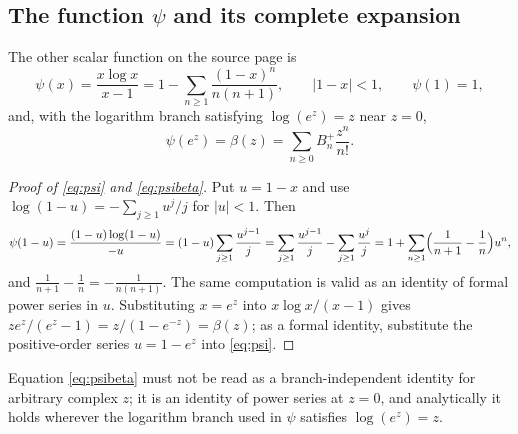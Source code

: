 \subsection{The function \texorpdfstring{$\psi$}{psi} and its complete expansion}
The other scalar function on the source page is
\begin{equation}\label{eq:psi}
 \psi(x)=\frac{x\log x}{x-1}=1-\sum_{n\geq1}\frac{(1-x)^n}{n(n+1)},
 \qquad|1-x|<1,\qquad \psi(1)=1,
\end{equation}
and, with the logarithm branch satisfying $\log(e^z)=z$ near $z=0$,
\begin{equation}\label{eq:psibeta}
 \psi(e^z)=\beta(z)=\sum_{n\geq0}B_n^+\frac{z^n}{n!}.
\end{equation}
\begin{proof}[Proof of \eqref{eq:psi} and \eqref{eq:psibeta}]
Put $u=1-x$ and use $\log(1-u)=-\sum_{j\geq1}u^j/j$ for $|u|<1$. Then
\[
 \psi(1-u)=\frac{(1-u)\log(1-u)}{-u}
 =(1-u)\sum_{j\geq1}\frac{u^{j-1}}{j}
 =\sum_{j\geq1}\frac{u^{j-1}}{j}-\sum_{j\geq1}\frac{u^{j}}{j}
 =1+\sum_{n\geq1}\Bigl(\frac1{n+1}-\frac1n\Bigr)u^n,
\]
and $\frac1{n+1}-\frac1n=-\frac1{n(n+1)}$. The same computation is valid as
an identity of formal power series in $u$. Substituting $x=e^z$ into
$x\log x/(x-1)$ gives $ze^z/(e^z-1)=z/(1-e^{-z})=\beta(z)$; as a formal
identity, substitute the positive-order series $u=1-e^z$ into
\eqref{eq:psi}.
\end{proof}
Equation \eqref{eq:psibeta} must not be read as a branch-independent
identity for arbitrary complex $z$; it is an identity of power series at
$z=0$, and analytically it holds wherever the logarithm branch used in
$\psi$ satisfies $\log(e^z)=z$.
